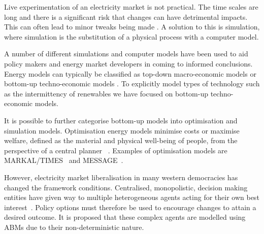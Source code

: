 \documentclass[12pt]{article}
\begin{document}
Live experimentation of an electricity market is not practical. The time scales are long and there is a significant risk that changes can have detrimental impacts. This can often lead to minor tweaks being made \cite{Forshaw2016}. A solution to this is simulation, where simulation is the substitution of a physical process with a computer model.

A number of different simulations and computer models have been used to aid policy makers and energy market developers in  coming to informed conclusions. Energy models can typically be classified as top-down macro-economic models or bottom-up techno-economic models \cite{Bohringer1998}. To explicitly model types of technology such as the intermittency of renewables we have focused on bottom-up techno-economic models.

It is possible to further categorise bottom-up models into optimisation and simulation models. Optimisation energy models minimise costs or maximise welfare, defined as the material and physical well-being of people, from the perspective of a central planner ~\cite{Keles2017}. Examples of optimisation models are MARKAL/TIMES~\cite{Fishbone1981} and MESSAGE~\cite{Schrattenholzer1981}. 

However, electricity market liberalisation in many western democracies has changed the framework conditions. Centralised, monopolistic, decision making entities have given way to multiple heterogeneous agents acting for their own best interest~\cite{Most2010}. Policy options must therefore be used to encourage changes to attain a desired outcome. It is proposed that these complex agents are modelled using ABMs due to their non-deterministic nature. 
\end{document}

